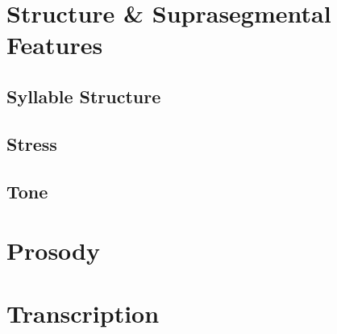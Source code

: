 \documentclass[a4paper,11pt,oneside,openany]{memoir}
\begin{document}
\section{Structure \& Suprasegmental Features}

\subsection{Syllable Structure}

\subsection{Stress}


\subsection{Tone}

\section{Prosody}

\section{Transcription}
\end{document}
